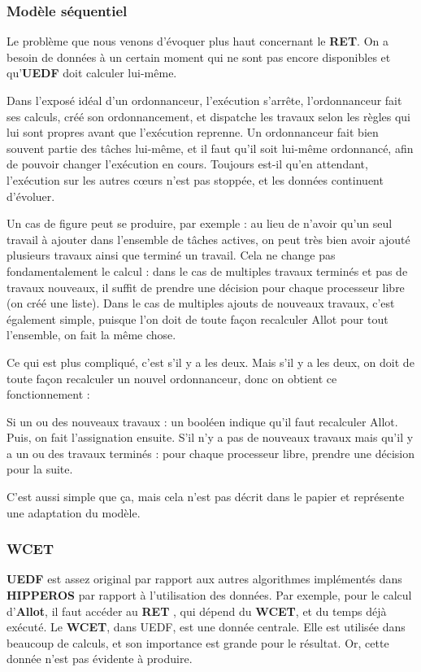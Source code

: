 	\subsubsection{Modèle séquentiel}
	
		Le problème que nous venons d'évoquer plus haut concernant le \textbf{RET}. On a besoin de données 
		à un certain moment qui ne sont pas encore disponibles et qu'\textbf{UEDF} doit calculer lui-même. 
		
		Dans l'exposé idéal d'un ordonnanceur, l'exécution s'arrête, l'ordonnanceur fait ses calculs, créé son 
		ordonnancement, et dispatche les travaux selon les règles qui lui sont propres avant que l'exécution reprenne. 
		Un ordonnanceur fait bien souvent partie des tâches lui-même, et il faut qu'il soit lui-même ordonnancé, 
		afin de pouvoir changer l'exécution en cours. Toujours est-il qu'en attendant, l'exécution sur les autres cœurs 
		n'est pas stoppée, et les données continuent d'évoluer. 
		
		Un cas de figure peut se produire, par exemple : au lieu de n'avoir qu'un seul travail à ajouter dans 
		l'ensemble de tâches actives, on peut très bien avoir ajouté plusieurs travaux ainsi que terminé un travail.
		Cela ne change pas fondamentalement le calcul : dans le cas de multiples travaux terminés et pas de travaux nouveaux, 
		il suffit de prendre une décision pour chaque processeur libre (on créé une liste).
		Dans le cas de multiples ajouts de nouveaux travaux, c'est également simple, puisque l'on 
		doit de toute façon recalculer Allot pour tout l'ensemble, on fait la même chose. 
		
		Ce qui est plus compliqué, c'est s'il y a les deux. Mais s'il y a les deux, on doit 
		de toute façon recalculer un nouvel ordonnanceur, donc on obtient ce fonctionnement :
		
		Si un ou des nouveaux travaux : un booléen indique qu'il faut recalculer Allot. Puis, 
		on fait l'assignation ensuite.
		S'il n'y a pas de nouveaux travaux mais qu'il y a un ou des travaux terminés :
		pour chaque processeur libre, prendre une décision pour la suite.\newline
		
		C'est aussi simple que ça, mais cela n'est pas décrit dans le papier et représente une 
		adaptation du modèle.
	
	
		
	\subsubsection{WCET}
		\textbf{UEDF} est assez original par rapport aux autres algorithmes implémentés dans \textbf{HIPPEROS} 
		par rapport à l'utilisation des données. Par exemple, pour le calcul d'\textbf{Allot}, il faut accéder 
		au \textbf{RET} , qui dépend du \textbf{WCET}, et du temps déjà exécuté. 
		Le \textbf{WCET}, dans UEDF, est une donnée centrale. Elle est utilisée dans beaucoup de calculs, et 
		son importance est grande pour le résultat. Or, cette donnée n'est pas évidente à produire. \newline
		
